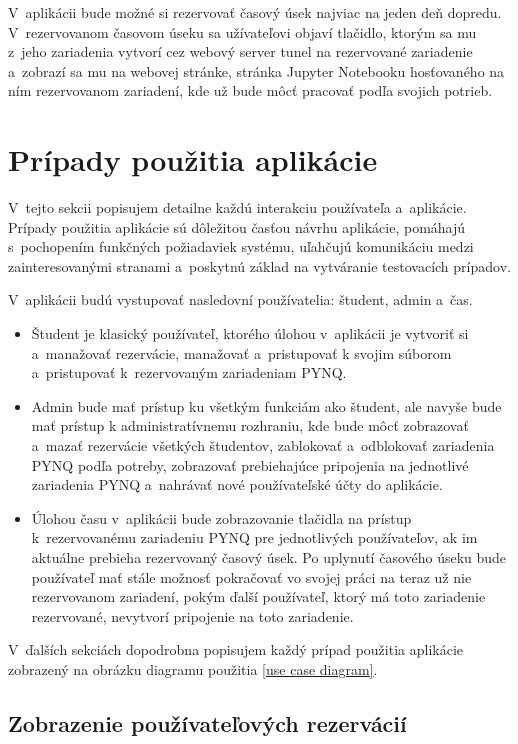 V~aplikácii bude možné si rezervovať časový úsek najviac na jeden deň dopredu. V~rezervovanom časovom úseku sa užívateľovi objaví tlačidlo, ktorým sa mu z~jeho zariadenia vytvorí cez webový server tunel na rezervované zariadenie a~zobrazí sa mu na webovej stránke, stránka Jupyter Notebooku hosťovaného na ním rezervovanom zariadení, kde už bude môcť pracovať podľa svojich potrieb.

\section{Prípady použitia aplikácie}

V~tejto sekcii popisujem detailne každú interakciu používateľa a~aplikácie. Prípady použitia aplikácie sú dôležitou časťou návrhu aplikácie, pomáhajú s~pochopením funkčných požiadaviek systému, uľahčujú komunikáciu medzi zainteresovanými stranami a~poskytnú základ na vytváranie testovacích prípadov.

V~aplikácii budú vystupovať nasledovní používatelia: študent, admin a~čas.
\begin{itemize}
    \item Študent je klasický používateľ, ktorého úlohou v~aplikácii je vytvoriť si a~manažovať rezervácie, manažovať a~pristupovať k svojim súborom a~pristupovať k~rezervovaným zariadeniam PYNQ.
    \item Admin bude mať prístup ku všetkým funkciám ako študent, ale navyše bude mať prístup k administratívnemu rozhraniu, kde bude môcť zobrazovať a~mazať rezervácie všetkých študentov, zablokovať a~odblokovať zariadenia PYNQ podľa potreby, zobrazovať prebiehajúce pripojenia na jednotlivé zariadenia PYNQ a~nahrávať nové používateľské účty do aplikácie.
    \item Úlohou času v~aplikácii bude zobrazovanie tlačidla na prístup k~rezervovanému zariadeniu PYNQ pre jednotlivých používateľov, ak im aktuálne prebieha rezervovaný časový úsek. Po uplynutí časového úseku bude používateľ mať stále možnosť pokračovať vo svojej práci na teraz už nie rezervovanom zariadení, pokým ďalší používateľ, ktorý má toto zariadenie rezervované, nevytvorí pripojenie na toto zariadenie.
\end{itemize}

V~ďalších sekciách dopodrobna popisujem každý prípad použitia aplikácie zobrazený na obrázku diagramu použitia \ref{use case diagram}.

\subsection{Zobrazenie používateľových rezervácií}


